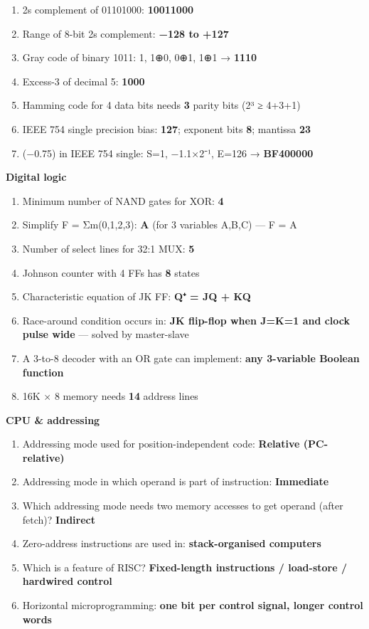 \begin{enumerate}
\def\labelenumi{\arabic{enumi}.}
\tightlist
\item
  2\textquotesingle s complement of 01101000: \textbf{10011000}
\item
  Range of 8-bit 2\textquotesingle s complement: \textbf{−128 to +127}
\item
  Gray code of binary 1011: 1, 1⊕0, 0⊕1, 1⊕1 → \textbf{1110}
\item
  Excess-3 of decimal 5: \textbf{1000}
\item
  Hamming code for 4 data bits needs \textbf{3} parity bits (2³ ≥ 4+3+1)
\item
  IEEE 754 single precision bias: \textbf{127}; exponent bits \textbf{8}; mantissa \textbf{23}
\item
  (−0.75) in IEEE 754 single: S=1, −1.1×2⁻¹, E=126 → \textbf{BF400000}
\end{enumerate}

\textbf{Digital logic}

\begin{enumerate}
\def\labelenumi{\arabic{enumi}.}
\setcounter{enumi}{7}
\tightlist
\item
  Minimum number of NAND gates for XOR: \textbf{4}
\item
  Simplify F = Σm(0,1,2,3): \textbf{A\textquotesingle{}} (for 3 variables A,B,C) --- F = A\textquotesingle{}
\item
  Number of select lines for 32:1 MUX: \textbf{5}
\item
  Johnson counter with 4 FFs has \textbf{8} states
\item
  Characteristic equation of JK FF: \textbf{Q⁺ = JQ\textquotesingle{} + K\textquotesingle Q}
\item
  Race-around condition occurs in: \textbf{JK flip-flop when J=K=1 and clock pulse wide} --- solved by master-slave
\item
  A 3-to-8 decoder with an OR gate can implement: \textbf{any 3-variable Boolean function}
\item
  16K × 8 memory needs \textbf{14} address lines
\end{enumerate}

\textbf{CPU \& addressing}

\begin{enumerate}
\def\labelenumi{\arabic{enumi}.}
\setcounter{enumi}{15}
\tightlist
\item
  Addressing mode used for position-independent code: \textbf{Relative (PC-relative)}
\item
  Addressing mode in which operand is part of instruction: \textbf{Immediate}
\item
  Which addressing mode needs two memory accesses to get operand (after fetch)? \textbf{Indirect}
\item
  Zero-address instructions are used in: \textbf{stack-organised computers}
\item
  Which is a feature of RISC? \textbf{Fixed-length instructions / load-store / hardwired control}
\item
  Horizontal microprogramming: \textbf{one bit per control signal, longer control words}
\end{enumerate}

